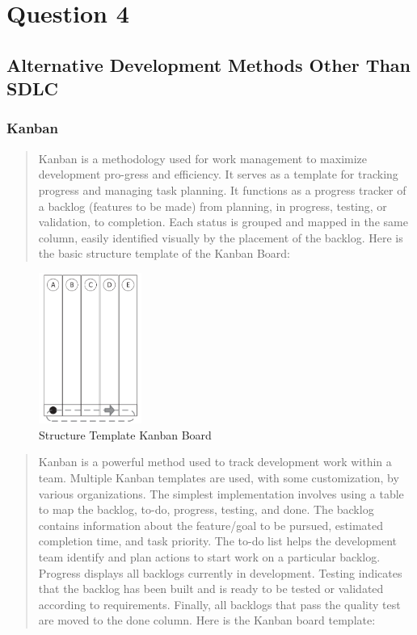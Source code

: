 \documentclass[12pt,a4paper]{article}
\begin{document}
\pagebreak


\setcounter{page}{6}
\section{Question 4}
\subsection{Alternative Development Methods Other Than SDLC}
\label{sec:Question 4}

\subsubsection{Kanban}

\begin{quote}
Kanban is a methodology used for work management to maximize development pro-gress and efficiency. It serves as a template for tracking progress and managing task planning. It functions as a progress tracker of a backlog (features to be made) from planning, in progress, testing, or validation, to completion. Each status is grouped and mapped in the same column, easily identified visually by the placement of the backlog. Here is the basic structure template of the Kanban Board:    
\end{quote}

\begin{figure}[htbp]
    \centering
    \includegraphics[width=0.3\textwidth]{images/kanban structure.png}
    \caption{Structure Template Kanban Board \citep{question_4.1}}
    \label{fig:example}
\end{figure}

\begin{quote}
    Kanban is a powerful method used to track development work within a team. Multiple Kanban templates are used, with some customization, by various organizations. The simplest implementation involves using a table to map the backlog, to-do, progress, testing, and done. The backlog contains information about the feature/goal to be pursued, estimated completion time, and task priority. The to-do list helps the development team identify and plan actions to start work on a particular backlog. Progress displays all backlogs currently in development. Testing indicates that the backlog has been built and is ready to be tested or validated according to requirements. Finally, all backlogs that pass the quality test are moved to the done column. Here is the Kanban board template:
\end{quote}
\end{document}
